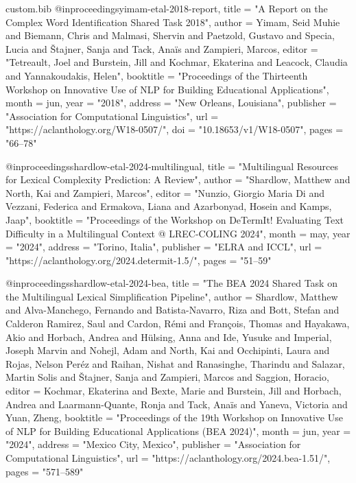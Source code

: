 \begin{filecontents*}[overwrite]{custom.bib}
@inproceedings{yimam-etal-2018-report,
    title = "A Report on the Complex Word Identification Shared Task 2018",
    author = {Yimam, Seid Muhie  and
      Biemann, Chris  and
      Malmasi, Shervin  and
      Paetzold, Gustavo  and
      Specia, Lucia  and
      {\v{S}}tajner, Sanja  and
      Tack, Ana{\"i}s  and
      Zampieri, Marcos},
    editor = "Tetreault, Joel  and
      Burstein, Jill  and
      Kochmar, Ekaterina  and
      Leacock, Claudia  and
      Yannakoudakis, Helen",
    booktitle = "Proceedings of the Thirteenth Workshop on Innovative Use of {NLP} for Building Educational Applications",
    month = jun,
    year = "2018",
    address = "New Orleans, Louisiana",
    publisher = "Association for Computational Linguistics",
    url = "https://aclanthology.org/W18-0507/",
    doi = "10.18653/v1/W18-0507",
    pages = "66--78"
}

@inproceedings{shardlow-etal-2024-multilingual,
    title = "Multilingual Resources for Lexical Complexity Prediction: A Review",
    author = "Shardlow, Matthew  and
      North, Kai  and
      Zampieri, Marcos",
    editor = "Nunzio, Giorgio Maria Di  and
      Vezzani, Federica  and
      Ermakova, Liana  and
      Azarbonyad, Hosein  and
      Kamps, Jaap",
    booktitle = "Proceedings of the Workshop on DeTermIt! Evaluating Text Difficulty in a Multilingual Context @ LREC-COLING 2024",
    month = may,
    year = "2024",
    address = "Torino, Italia",
    publisher = "ELRA and ICCL",
    url = "https://aclanthology.org/2024.determit-1.5/",
    pages = "51--59"
}

@inproceedings{shardlow-etal-2024-bea,
    title = "The {BEA} 2024 Shared Task on the Multilingual Lexical Simplification Pipeline",
    author = {Shardlow, Matthew  and
      Alva-Manchego, Fernando  and
      Batista-Navarro, Riza  and
      Bott, Stefan  and
      Calderon Ramirez, Saul  and
      Cardon, R{\'e}mi  and
      Fran{\c{c}}ois, Thomas  and
      Hayakawa, Akio  and
      Horbach, Andrea  and
      H{\"u}lsing, Anna  and
      Ide, Yusuke  and
      Imperial, Joseph Marvin  and
      Nohejl, Adam  and
      North, Kai  and
      Occhipinti, Laura  and
      Rojas, Nelson Per{\'e}z  and
      Raihan, Nishat  and
      Ranasinghe, Tharindu  and
      Salazar, Martin Solis  and
      {\v{S}}tajner, Sanja  and
      Zampieri, Marcos  and
      Saggion, Horacio},
    editor = {Kochmar, Ekaterina  and
      Bexte, Marie  and
      Burstein, Jill  and
      Horbach, Andrea  and
      Laarmann-Quante, Ronja  and
      Tack, Ana{\"i}s  and
      Yaneva, Victoria  and
      Yuan, Zheng},
    booktitle = "Proceedings of the 19th Workshop on Innovative Use of NLP for Building Educational Applications (BEA 2024)",
    month = jun,
    year = "2024",
    address = "Mexico City, Mexico",
    publisher = "Association for Computational Linguistics",
    url = "https://aclanthology.org/2024.bea-1.51/",
    pages = "571--589"
}


\end{filecontents*}
